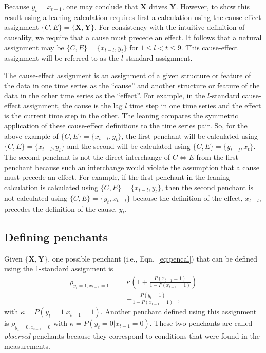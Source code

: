 \documentclass[twocolumn,aps,pre,groupedaddress]{revtex4-1}
\begin{document}
Because $y_t=x_{t-1}$, one may conclude that $\mathbf{X}$ drives $\mathbf{Y}$.  However, to show this result using a leaning calculation requires first a calculation using the cause-effect assignment $\{C,E\}=\{\mathbf{X},\mathbf{Y}\}$. For consistency with the intuitive definition of causality, we require that a cause must precede an effect.  It follows that a natural assignment may be $\{C,E\}=\{x_{t-l},y_t\}$ for $1 \leq l < t \leq 9$.  This cause-effect assignment will be referred to as the $l$-standard assignment.

The cause-effect assignment is an assignment of a given structure or feature of the data in one time series as the ``cause'' and another structure or feature of the data in the other time series as the ``effect''.  For example, in the $l$-standard cause-effect assignment, the cause is the lag $l$ time step in one time series and the effect is the current time step in the other.  The leaning compares the symmetric application of these cause-effect definitions to the time series pair.  So, for the above example of $\{C,E\}=\{x_{t-l},y_t\}$, the first penchant will be calculated using $\{C,E\}=\{x_{t-l},y_t\}$ and the second will be calculated using $\{C,E\}=\{y_{t-l},x_t\}$.  The second penchant is not the direct interchange of $C\Leftrightarrow E$ from the first penchant because such an interchange would violate the assumption that a cause must precede an effect.  For example, if the first penchant in the leaning calculation is calculated using $\{C,E\}=\{x_{t-l},y_t\}$, then the second penchant is not calculated using $\{C,E\}=\{y_t,x_{t-l}\}$ because the definition of the effect, $x_{t-l}$, precedes the definition of the cause, $y_t$.

\subsection{Defining penchants}
Given $\{\mathbf{X},\mathbf{Y}\}$, one possible penchant (i.e., Eqn.\ \ref{eq:pencal}) that can be defined using the 1-standard assignment is
\begin{eqnarray*}
\rho_{y_{t}=1,x_{t-1}=1} &=& \kappa \left(1+\frac{P\left(x_{t-1} = 1\right)}{1-P\left(x_{t-1} = 1\right)}\right)\\
& & -\frac{P\left(y_{t} = 1\right)}{1-P\left(x_{t-1} = 1\right)}\;\;,
\end{eqnarray*}
with $\kappa = P\left( y_t = 1 | x_{t-1} = 1\right)$.  Another penchant defined using this assignment is $\rho_{y_t=0,x_{t-1}=0}$ with  $\kappa = P\left( y_t = 0 | x_{t-1} = 0\right)$.  These two penchants are called {\em observed} penchants because they correspond to conditions that were found in the measurements.  
\end{document}

